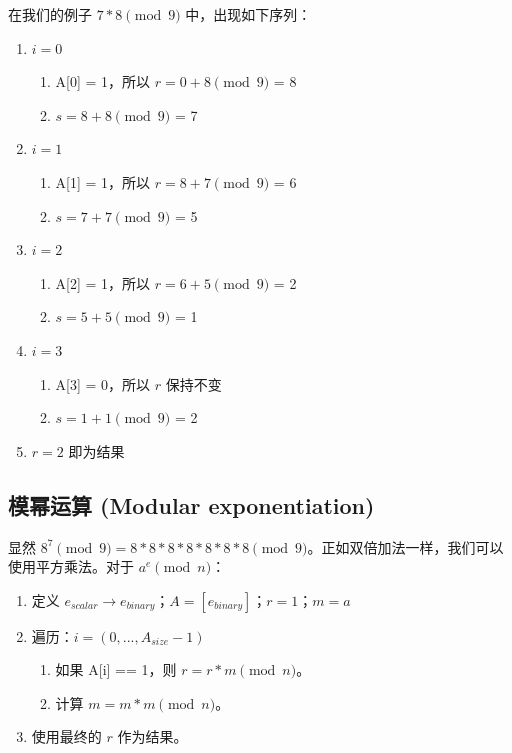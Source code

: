 在我们的例子 $7*8 \pmod 9$ 中，出现如下序列：
\begin{enumerate}
	\item $i = 0$
	\begin{enumerate}
		\item A[0] = 1，所以 $r = 0 + 8 \pmod 9$ = 8
		\item $s = 8 + 8 \pmod 9$ = 7
	\end{enumerate}
	\item $i = 1$
	\begin{enumerate}
		\item A[1] = 1，所以 $r = 8 + 7 \pmod 9$ = 6
		\item $s = 7 + 7 \pmod 9$ = 5
	\end{enumerate}
	\item $i = 2$
	\begin{enumerate}
		\item A[2] = 1，所以 $r = 6 + 5 \pmod 9$ = 2
		\item $s = 5 + 5 \pmod 9$ = 1
	\end{enumerate}
	\item $i = 3$
	\begin{enumerate}
		\item A[3] = 0，所以 $r$ 保持不变
		\item $s = 1 + 1 \pmod 9$ = 2
	\end{enumerate}
	\item $r = 2$ 即为结果
\end{enumerate}


\subsection{模幂运算 (Modular exponentiation)}

显然 $8^7 \pmod 9 = 8*8*8*8*8*8*8 \pmod 9$。正如双倍加法一样，我们可以使用平方乘法。对于 $a^e \pmod{n}$：
\begin{enumerate}
	\item 定义 $e_{scalar} \rightarrow e_{binary}$；$A = [e_{binary}]$；$r = 1$；$m = a$
	\item 遍历：$i = (0,...,A_{size} - 1)$
	\begin{enumerate}
		\item 如果 A[i] == 1，则 $r = r * m \pmod n$。
		\item 计算 $m = m * m \pmod n$。
	\end{enumerate}
	\item 使用最终的 $r$ 作为结果。
\end{enumerate}


